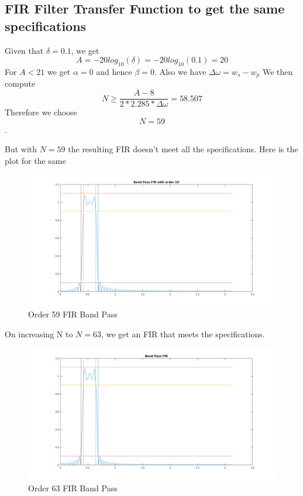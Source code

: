 \documentclass[22pt]{article}
\begin{document}
\subsection{FIR Filter Transfer Function to get the same specifications}
Given that $\delta = 0.1$, we get $$A = -20log_{10}(\delta) = -20log_{10}(0.1) = 20$$
For  $A < 21$ we get $\alpha = 0$ and hence $\beta = 0$.
Also we have $\Delta\omega = w_s - w_p$
We then compute $$N \ge \frac{A-8}{2*2.285*\Delta\omega} = 58.507$$
Therefore we choose $$N = 59$$.

But with $N = 59$ the resulting FIR doesn't meet all the specifications. Here is the plot for the same
\begin{figure}[H]
  \centering
  \includegraphics[scale=0.5]{images/Band_pass_fir_order_59}
  \caption{Order 59 FIR Band Pass}
  \label{fig:7}
\end{figure}

On increasing N to $N = 63$, we get an FIR that meets the specifications.
\begin{figure}[H]
  \centering
  \includegraphics[scale=0.5]{images/Band_pass_fir_order_63}
  \caption{Order 63 FIR Band Pass}
  \label{fig:8}
\end{figure}
\end{document}
